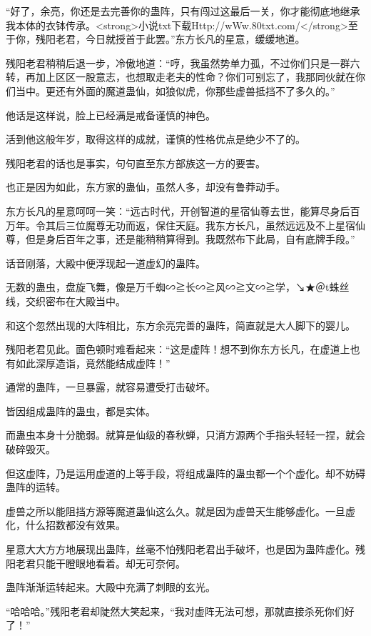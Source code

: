 
\begin{this_body}

“好了，余亮，你还是去完善你的蛊阵，只有闯过这最后一关，你才能彻底地继承我本体的衣钵传承。<strong>小说txt下载Http://wWw.80txt.com/</strong>至于你，残阳老君，今日就授首于此罢。”东方长凡的星意，缓缓地道。

残阳老君稍稍后退一步，冷傲地道：“哼，我虽然势单力孤，不过你们只是一群六转，再加上区区一股意志，也想取走老夫的性命？你们可别忘了，我那同伙就在你们当中。更还有外面的魔道蛊仙，如狼似虎，你那些虚兽抵挡不了多久的。”

他话是这样说，脸上已经满是戒备谨慎的神色。

活到他这般年岁，取得这样的成就，谨慎的性格优点是绝少不了的。

残阳老君的话也是事实，句句直至东方部族这一方的要害。

也正是因为如此，东方家的蛊仙，虽然人多，却没有鲁莽动手。

东方长凡的星意呵呵一笑：“远古时代，开创智道的星宿仙尊去世，能算尽身后百万年。令其后三位魔尊无功而返，保住天庭。我东方长凡，虽然远远及不上星宿仙尊，但是身后百年之事，还是能稍稍算得到。我既然布下此局，自有底牌手段。”

话音刚落，大殿中便浮现起一道虚幻的蛊阵。

无数的蛊虫，盘旋飞舞，像是万千蜘∽≧长∽≧风∽≧文∽≧学，↘★＠t蛛丝线，交织密布在大殿当中。

和这个忽然出现的大阵相比，东方余亮完善的蛊阵，简直就是大人脚下的婴儿。

残阳老君见此。面色顿时难看起来：“这是虚阵！想不到你东方长凡，在虚道上也有如此深厚造诣，竟然能结成虚阵！”

通常的蛊阵，一旦暴露，就容易遭受打击破坏。

皆因组成蛊阵的蛊虫，都是实体。

而蛊虫本身十分脆弱。就算是仙级的春秋蝉，只消方源两个手指头轻轻一捏，就会破碎毁灭。

但这虚阵，乃是运用虚道的上等手段，将组成蛊阵的蛊虫都一个个虚化。却不妨碍蛊阵的运转。

虚兽之所以能阻挡方源等魔道蛊仙这么久。就是因为虚兽天生能够虚化。一旦虚化，什么招数都没有效果。

星意大大方方地展现出蛊阵，丝毫不怕残阳老君出手破坏，也是因为蛊阵虚化。残阳老君只能干瞪眼地看着。却无可奈何。

蛊阵渐渐运转起来。大殿中充满了刺眼的玄光。

“哈哈哈。”残阳老君却陡然大笑起来，“我对虚阵无法可想，那就直接杀死你们好了！”


\end{this_body}

